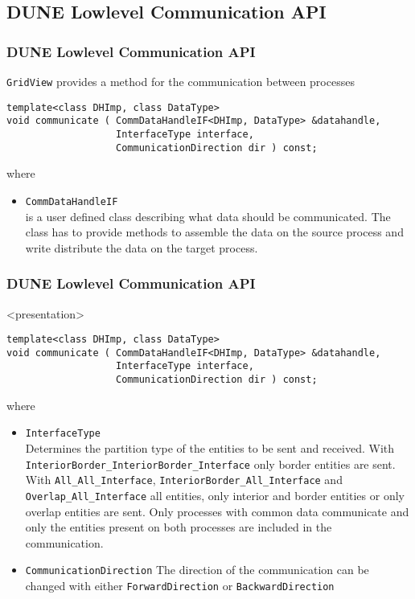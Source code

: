 \subsection{DUNE Lowlevel Communication API}
\begin{frame}[fragile]
  \frametitle<presentation>{DUNE Lowlevel Communication API}

  \texttt{GridView} provides a method for the communication between processes
    \begin{lstlisting}
template<class DHImp, class DataType>
void communicate ( CommDataHandleIF<DHImp, DataType> &datahandle,
                   InterfaceType interface,
                   CommunicationDirection dir ) const;
    \end{lstlisting}
where
    \begin{itemize}
    \item \lstinline!CommDataHandleIF!\\
      is a user defined class describing what data should be communicated. The class has to provide methods to assemble the data on the
      source process and write distribute the data on the target process.
    \end{itemize}
\end{frame}


\begin{frame}[fragile]
  \frametitle<presentation>{DUNE Lowlevel Communication API}
  \begin{onlyenv}<presentation>
    \begin{lstlisting}
template<class DHImp, class DataType>
void communicate ( CommDataHandleIF<DHImp, DataType> &datahandle,
                   InterfaceType interface,
                   CommunicationDirection dir ) const;
    \end{lstlisting}
\lstset{basicstyle=\normalsize\ttfamily}
where
    \end{onlyenv}
    \begin{itemize}
    \item \lstinline!InterfaceType!\\
    Determines the partition type of the entities to be sent and received. With \lstinline!InteriorBorder_InteriorBorder_Interface! only
border entities are sent. With \lstinline!All_All_Interface!,
    \lstinline!InteriorBorder_All_Interface! and
    \lstinline!Overlap_All_Interface! all entities, only interior and border entities or only overlap entities are sent. Only processes with common
data communicate and only the entities present on both processes are included in the communication.
    \item \lstinline!CommunicationDirection!
      The direction of the communication can be changed with either \lstinline!ForwardDirection! or
      \lstinline!BackwardDirection!
    \end{itemize}
\end{frame}



